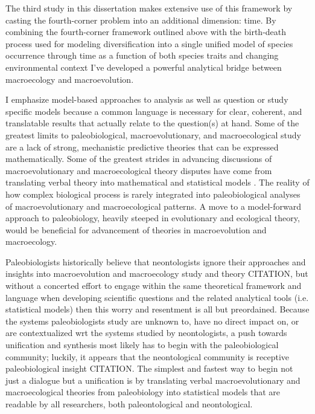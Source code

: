 The third study in this dissertation makes extensive use of this framework by casting the fourth-corner problem into an additional dimension: time. By combining the fourth-corner framework outlined above \citep{Warton2015a,Brown2014c} with the birth-death process used for modeling diversification into a single unified model of species occurrence through time as a function of both species traits and changing environmental context I've developed a powerful analytical bridge between macroecology and macroevolution.

I emphasize model-based approaches to analysis as well as question or study specific models because a common language is necessary for clear, coherent, and translatable results that actually relate to the question(s) at hand. Some of the greatest limits to paleobiological, macroevolutionary, and macroecological study are a lack of strong, mechanistic predictive theories that can be expressed mathematically. Some of the greatest strides in advancing discussions of macroevolutionary and macroecological theory disputes have come from translating verbal theory into mathematical and statistical models \citep{Raup1973,Nee1992,Felsenstein1985b,Hunt2006a,Hunt2007,Shipley2006}. The reality of how complex biological process is rarely integrated into paleobiological analyses of macroevolutionary and macroecological patterns. A move to a model-forward approach to paleobiology, heavily steeped in evolutionary and ecological theory, would be beneficial for advancement of theories in macroevolution and macroecology. 

Paleobiologists historically believe that neontologists ignore their approaches and insights into macroevolution and macroecology study and theory CITATION, but without a concerted effort to engage within the same theoretical framework and language when developing scientific questions and the related analytical tools (i.e. statistical models) then this worry and resentment is all but preordained. Because the systems paleobiologists study are unknown to, have no direct impact on, or are contextualized wrt the systems studied by neontologists, a push towards unification and synthesis most likely has to begin with the paleobiological community; luckily, it appears that the neontological community is receptive paleobiological insight CITATION. The simplest and fastest way to begin not just a dialogue but a unification is by translating verbal macroevolutionary and macroecological theories from paleobiology into statistical models that are readable by all researchers, both paleontological and neontological.


